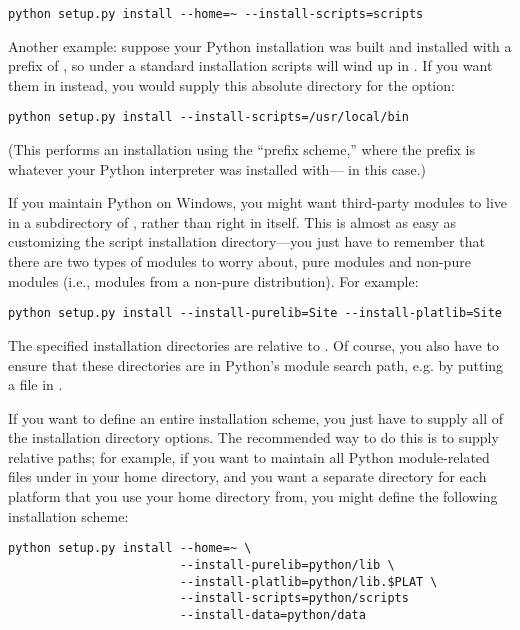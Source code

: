 \documentclass{howto}
\begin{document}
\begin{verbatim}
python setup.py install --home=~ --install-scripts=scripts
\end{verbatim}

Another \UNIX{} example: suppose your Python installation was built and
installed with a prefix of , so under a standard 
installation scripts will wind up in .  If
you want them in  instead, you would supply this
absolute directory for the  option:

\begin{verbatim}
python setup.py install --install-scripts=/usr/local/bin
\end{verbatim}

(This performs an installation using the ``prefix scheme,'' where the
prefix is whatever your Python interpreter was installed with---
 in this case.)

If you maintain Python on Windows, you might want third-party modules to
live in a subdirectory of , rather than right in
 itself.  This is almost as easy as customizing the
script installation directory---you just have to remember that there are
two types of modules to worry about, pure modules and non-pure modules
(i.e., modules from a non-pure distribution).  For example:

\begin{verbatim}
python setup.py install --install-purelib=Site --install-platlib=Site
\end{verbatim}

The specified installation directories are relative to .
Of course, you also have to ensure that these directories are in
Python's module search path, e.g. by putting a  file in
.


If you want to define an entire installation scheme, you just have to
supply all of the installation directory options.  The recommended way
to do this is to supply relative paths; for example, if you want to
maintain all Python module-related files under  in your
home directory, and you want a separate directory for each platform that
you use your home directory from, you might define the following
installation scheme:

\begin{verbatim}
python setup.py install --home=~ \
                        --install-purelib=python/lib \
                        --install-platlib=python/lib.$PLAT \
                        --install-scripts=python/scripts
                        --install-data=python/data
\end{verbatim}
\end{document}
